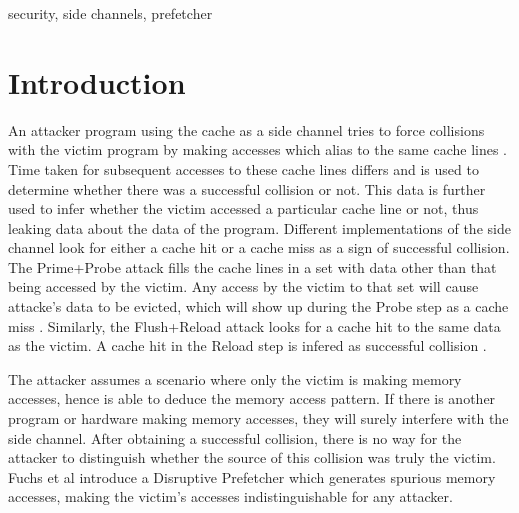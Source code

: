 \documentclass[conference]{IEEEtran}
\begin{document}
\begin{IEEEkeywords}
security, side channels, prefetcher
\end{IEEEkeywords}

\section{Introduction}

An attacker program using the cache as a side channel tries to force
collisions with the victim program by making accesses which alias to the
same cache lines \cite{osvik-cache-attacks}.
Time taken for subsequent accesses to these cache lines differs and is used to
determine whether there was a successful collision or not.
This data is further used to infer whether the victim accessed a particular
cache line or not, thus leaking data about the data of the program.
Different implementations of the side channel look for either a cache
hit or a cache miss as a sign of successful collision.
The Prime+Probe attack fills the cache lines in a set with data other than
that being accessed by the victim. Any access by the victim to that set will
cause attacke's data to be evicted, which will show up during the Probe step
as a cache miss \cite{osvik-cache-attacks} \cite{percival-rsa}.
Similarly, the Flush+Reload attack looks for a cache hit to the same
data as the victim. A cache hit in the Reload step is infered as successful
collision \cite{yaron-falkner}.

The attacker assumes a scenario where only the victim is making memory
accesses, hence is able to deduce the memory access pattern. If there is
another program or hardware making memory accesses, they will surely
interfere with the side channel. After obtaining a successful collision,
there is no way for the attacker to distinguish whether the source of
this collision was truly the victim. Fuchs et al \cite{fuchs-disruptive}
introduce a Disruptive Prefetcher which generates spurious memory accesses,
making the victim's accesses indistinguishable for any attacker.
\end{document}
